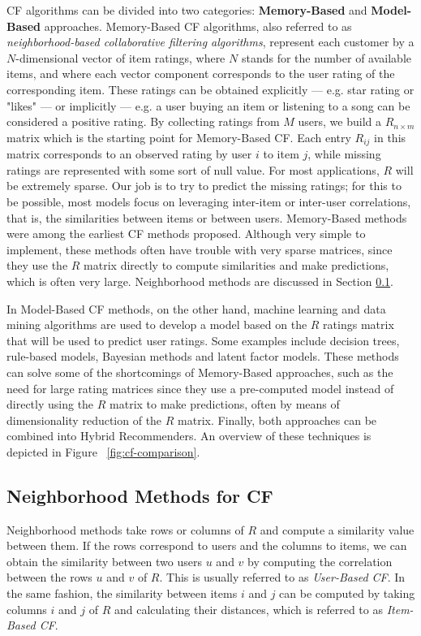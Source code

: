 \documentclass[cic,tc,english]{iiufrgs}
\begin{document}
CF algorithms can be divided into two categories: \textbf{Memory-Based} and \textbf{Model-Based} approaches. Memory-Based CF algorithms, also referred to as \textit{neighborhood-based collaborative filtering algorithms}, represent each customer by a \(N\)-dimensional vector of item ratings, where \(N\) stands for the number of available items, and where each vector component corresponds to the user rating of the corresponding item. These ratings can be obtained explicitly --- e.g. star rating or "likes" --- or implicitly --- e.g. a user buying an item or listening to a song can be considered a positive rating. By collecting ratings from $M$ users, we build a \(R_{n \times m}\) matrix which is the starting point for Memory-Based CF. Each entry $R_{ij}$ in this matrix corresponds to an observed rating by user $i$ to item $j$, while missing ratings are represented with some sort of null value. For most applications, $R$ will be extremely sparse. Our job is to try to predict the missing ratings; for this to be possible, most models focus on leveraging inter-item or inter-user correlations, that is, the similarities between items or between users. Memory-Based methods were among the earliest CF methods proposed. Although very simple to implement, these methods often have trouble with very sparse matrices, since they use the $R$ matrix directly to compute similarities and make predictions, which is often very large. Neighborhood methods are discussed in Section \ref{neighbourhood}.

In Model-Based CF methods, on the other hand, machine learning and data mining algorithms are used to develop a model based on the $R$ ratings matrix that will be used to predict user ratings. Some examples include decision trees, rule-based models, Bayesian methods and latent factor models. These methods can solve some of the shortcomings of Memory-Based approaches, such as the need for large rating matrices since they use a pre-computed model instead of directly using the $R$ matrix to make predictions, often by means of dimensionality reduction of the $R$ matrix. Finally, both approaches can be combined into Hybrid Recommenders. An overview of these techniques is depicted in Figure ~\ref{fig:cf-comparison}.

\subsection{Neighborhood Methods for CF} 
\label{neighbourhood}
    Neighborhood methods take rows or columns of $R$ and compute a similarity value between them. If the rows correspond to users and the columns to items, we can obtain the similarity between two users $u$ and $v$ by computing the correlation between the rows $u$ and $v$ of $R$. This is usually referred to as \textit{User-Based CF}. In the same fashion, the similarity between items $i$ and $j$ can be computed by taking columns $i$ and $j$ of $R$ and calculating their distances, which is referred to as \textit{Item-Based CF}.
\end{document}
